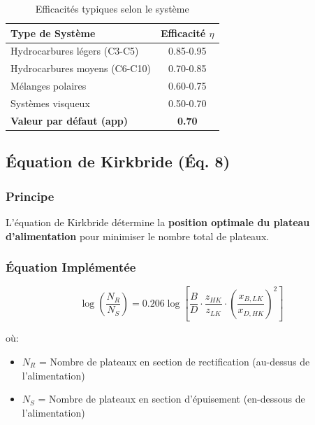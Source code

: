 \documentclass[11pt,a4paper]{article}
\begin{document}
\begin{table}[h]
\centering
\begin{tabular}{lc}
\toprule
\textbf{Type de Système} & \textbf{Efficacité $\eta$} \\
\midrule
Hydrocarbures légers (C3-C5) & 0.85-0.95 \\
Hydrocarbures moyens (C6-C10) & 0.70-0.85 \\
Mélanges polaires & 0.60-0.75 \\
Systèmes visqueux & 0.50-0.70 \\
\textbf{Valeur par défaut (app)} & \textbf{0.70} \\
\bottomrule
\end{tabular}
\caption{Efficacités typiques selon le système}
\end{table}

\subsection{Équation de Kirkbride (Éq. 8)}

\subsubsection{Principe}

L'équation de Kirkbride détermine la \textbf{position optimale du plateau d'alimentation} pour minimiser le nombre total de plateaux.

\subsubsection{Équation Implémentée}

\begin{tcolorbox}[colback=yellow!10,colframe=orange!50!black,title=Équation 8: Kirkbride]
\begin{equation}
\log\left(\frac{N_R}{N_S}\right) = 0.206 \log\left[\frac{B}{D} \cdot \frac{z_{HK}}{z_{LK}} \cdot \left(\frac{x_{B,LK}}{x_{D,HK}}\right)^2\right]
\end{equation}
\end{tcolorbox}

où:
\begin{itemize}[leftmargin=*]
    \item $N_R$ = Nombre de plateaux en section de rectification (au-dessus de l'alimentation)
    \item $N_S$ = Nombre de plateaux en section d'épuisement (en-dessous de l'alimentation)
\end{itemize}
\end{document}
